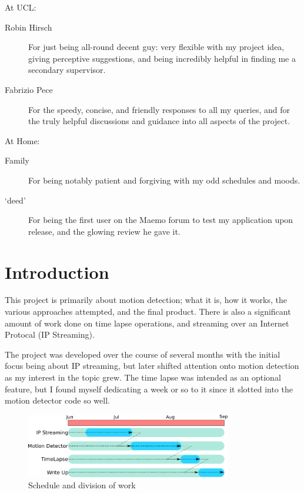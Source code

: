 \documentclass[11pt]{article} %
\begin{document}
	\begin{description}
	\item At UCL:
		\begin{description}
		\item [Robin Hirsch] For just being all-round decent guy: very flexible with my project idea, giving perceptive suggestions, and being incredibly helpful in finding me a secondary supervisor.
		\item [Fabrizio Pece] For the speedy, concise, and friendly responses to all my queries, and for the truly helpful discussions and guidance into all aspects of the project.

		\end{description}
	\item At Home:
		\begin{description}
		\item [Family] For being notably patient and forgiving with my odd schedules and moods.
		\item [‘deed’] For being the first user on the Maemo forum to test my application upon release, and the glowing review he gave it.
		\end{description}		
	\end{description}

\pagebreak

\part{Introduction}
This project is primarily about motion detection; what it is, how it works, the various approaches attempted, and the final product. There is also a significant amount of work done on time lapse operations, and streaming over an Internet Protocal (IP Streaming).

The project was developed over the course of several months with the initial focus being about IP streaming, but later shifted attention onto motion detection as my interest in the topic grew. The time lapse was intended as an optional feature, but I found myself dedicating a week or so to it since it slotted into the motion detector code so well.
 
\begin{figure}[H]
\includegraphics[width=0.8\textwidth]{images/timeline}
\caption{Schedule and division of work}
\label{fig:timmy}
\end{figure}
\end{document}
